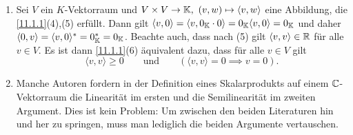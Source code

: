 \documentclass[../../main.tex]{subfiles}
\begin{document}
\begin{bem}\label{11.1.2}
\begin{enumerate}[\normalfont(a)]
\item Sei $V$ ein $K$-Vektorraum und $V\times V\to\mathbb K,\ (v,w)\mapsto\langle v,w\rangle$ eine Abbildung, die \ref{11.1.1}(4),(5) erfüllt.
Dann gilt $\langle v,0\rangle=\langle v,0_\mathbb K\cdot0\rangle=0_\mathbb K\langle v,0\rangle=0_\mathbb K$ und daher $\langle0,v\rangle=\langle v,0\rangle^*=0_\mathbb K^*=0_\mathbb K$. Beachte auch, dass
nach (5) gilt $\langle v,v\rangle\in\mathbb R$ für alle $v\in V$. Es ist dann
\ref{11.1.1}(6) äquivalent dazu, dass für alle $v\in V$ gilt
\begin{equation}\tag{6'}
\langle v,v\rangle\ge0\qquad\text{und}\qquad(\langle v,v\rangle=0\implies v=0).
\end{equation}
\item Manche Autoren fordern in der Definition eines Skalarprodukts auf einem $\mathbb C$-Vektor\-raum die Linearität im ersten und die Semilinearität im zweiten Argument.
Dies ist kein Problem: Um zwischen den beiden Literaturen hin und her zu springen, muss man lediglich die beiden Argumente vertauschen.
\end{enumerate}
\end{bem}
\end{document}
